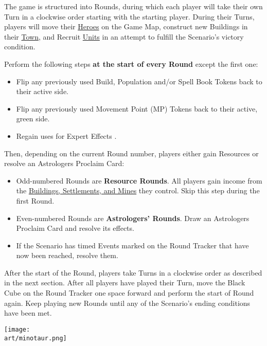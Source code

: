 
\begin{multicols*}{2}

The game is structured into Rounds, during which each player will take their own Turn in a clockwise order starting with the starting player.
During their Turns, players will move their \hyperlink{Heroes}{Heroes} on the Game Map, construct new Buildings in their \hyperlink{Town}{Town}, and Recruit \hyperlink{Units}{Units} in an attempt to fulfill the Scenario's victory condition.\par
Perform the following steps \textbf{at the start of every Round} except the first one:
\begin{itemize}
  \item Flip any previously used Build, Population and/or Spell Book Tokens back to their active side.
  \item Flip any previously used Movement Point (MP) Tokens back to their active, green side.
  \item Regain uses for Expert Effects .
\end{itemize}
Then, depending on the current Round number, players either gain Resources or resolve an Astrologers Proclaim Card:
\begin{itemize}
  \item Odd-numbered Rounds are \textbf{Resource Rounds}.
    All players gain income from the \hyperlink{Mines}{Buildings, Settlements, and Mines} they control.
    Skip this step during the first Round.
  \item Even-numbered Rounds are \textbf{Astrologers' Rounds}.
    Draw an Astrologers Proclaim Card and resolve its effects.
  \item If the Scenario has timed Events marked on the Round Tracker that have now been reached, resolve them.
\end{itemize}
After the start of the Round, players take Turns in a clockwise order as described in the next section.
After all players have played their Turn, move the Black Cube on the Round Tracker one space forward and perform the start of Round again.
Keep playing new Rounds until any of the Scenario's ending conditions have been met.

\vspace*{\fill}

\texttt{[image: \\art/minotaur.png]}

\end{multicols*}
